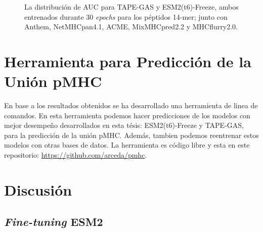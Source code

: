 \begin{figure}[H]
	\centering	
	
	\caption{
		La distribución de AUC para TAPE-GAS y ESM2(t6)-Freeze, ambos entrenados durante 30 \textit{epochs} para los péptidos 14-mer; junto con Anthem, NetMHCpan4.1, ACME, MixMHCpred2.2 y MHCflurry2.0.}
	\label{fig:auc_distribution14}
\end{figure}


\section{Herramienta para Predicción de la Unión pMHC}

En base a los resultados obtenidos se ha desarrollado una herramienta de linea de comandos. En esta herramienta podemos hacer predicciones de los modelos con mejor desempeño desarrollados en esta tésis: ESM2(t6)-Freeze y TAPE-GAS, para la predicción de la unión pMHC. Además, tambien podemos reentrenar estos modelos con otras bases de datos. La herramienta es código libre y esta en este repositorio: \href{https://github.com/arceda/pmhc}{https://github.com/arceda/pmhc}.




\section{Discusión}

\subsection{\textit{Fine-tuning} ESM2}

